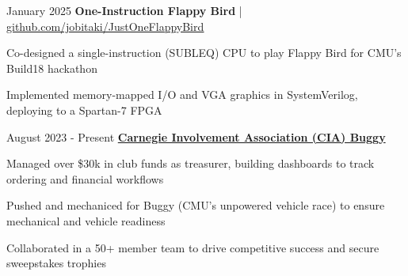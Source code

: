 \begin{twocolentry}
    {January 2025}
    {\textbf{One-Instruction Flappy Bird} | \href{https://github.com/jobitaki/JustOneFlappyBird}{\underline{github.com/jobitaki/JustOneFlappyBird}}}
\end{twocolentry}
\vspace{0.10 cm}
\begin{onecolentry}
    \begin{highlights}
        \item Co-designed a single-instruction (SUBLEQ) CPU to play Flappy Bird for CMU's Build18 hackathon
        \item Implemented memory-mapped I/O and VGA graphics in SystemVerilog, deploying to a Spartan-7 FPGA
    \end{highlights}
\end{onecolentry}

\vspace{0.2 cm} %

\begin{twocolentry}
    {August 2023 - Present}
    {\href{https://tartanconnect.cmu.edu/cia/top/}{\textbf{Carnegie Involvement Association (CIA) Buggy}}}
\end{twocolentry}
\vspace{0.10 cm}
\begin{onecolentry}
    \begin{highlights}
        \item Managed over \$30k in club funds as treasurer, building dashboards to track ordering and financial workflows
        \item Pushed and mechaniced for Buggy (CMU's unpowered vehicle race) to ensure mechanical and vehicle readiness
        \item Collaborated in a 50+ member team to drive competitive success and secure sweepstakes trophies
    \end{highlights}
\end{onecolentry}

